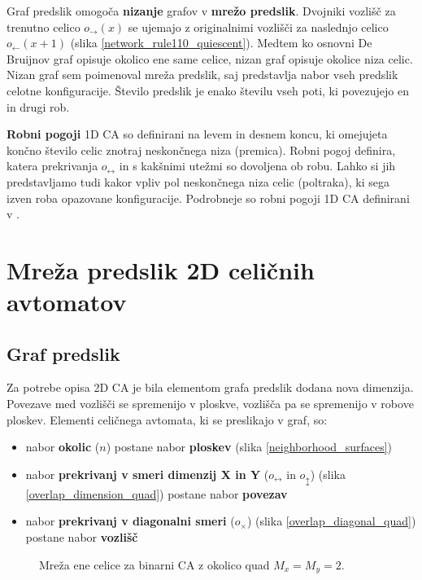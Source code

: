 \documentclass[12pt,a4paper,openany,twoside]{book}
\begin{document}
Graf predslik omogoča \textbf{nizanje} grafov v \textbf{mrežo predslik}.
Dvojniki vozlišč za trenutno celico \(o_{\rightarrow}(x)\) se ujemajo z
originalnimi vozlišči za naslednjo celico \(o_{\leftarrow}(x+1)\) (slika \ref{network_rule110_quiescent}).
Medtem ko osnovni De Bruijnov graf opisuje okolico ene same celice,
nizan graf opisuje okolice niza celic.
Nizan graf sem poimenoval mreža predslik,
saj predstavlja nabor vseh predslik celotne konfiguracije.
Število predslik je enako številu vseh poti,
ki povezujejo en in drugi rob.

\textbf{Robni pogoji} 1D CA so definirani na levem in desnem koncu,
ki omejujeta končno število celic znotraj neskončnega niza (premica).
Robni pogoj definira, katera prekrivanja \(o_{\leftrightarrow}\)
in s kakšnimi utežmi so dovoljena ob robu.
Lahko si jih predstavljamo tudi kakor vpliv pol neskončnega niza celic (poltraka),
ki sega izven roba opazovane konfiguracije.
Podrobneje so robni pogoji 1D CA definirani v \cite{JerasDobnikar2007}.

\section{Mreža predslik 2D celičnih avtomatov}

\subsection{Graf predslik}

Za potrebe opisa 2D CA je bila elementom grafa predslik dodana nova dimenzija.
Povezave med vozlišči se spremenijo v ploskve,
vozlišča pa se spremenijo v robove ploskev.
Elementi celičnega avtomata, ki se preslikajo v graf, so:
\begin{itemize}[noitemsep,nolistsep]
\item nabor \textbf{okolic} (\(n\)) postane nabor \textbf{ploskev} (slika \ref{neighborhood_surfaces})
\item nabor \textbf{prekrivanj v smeri dimenzij X in Y} (\(o_{\leftrightarrow}\) in \(o_{\updownarrow}\)) (slika \ref{overlap_dimension_quad}) postane nabor \textbf{povezav}
\item nabor \textbf{prekrivanj v diagonalni smeri} (\(o_{\times}\)) (slika \ref{overlap_diagonal_quad}) postane nabor \textbf{vozlišč}
\end{itemize}

\begin{figure}[htb]
\centerline{}
\caption[Mreža ene celice.]{Mreža ene celice za binarni CA z okolico quad \(M_x=M_y=2\).}
\label{network_single}
\end{figure}
\end{document}
